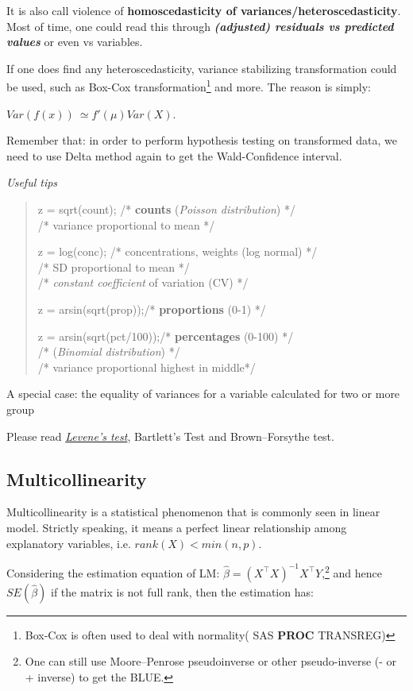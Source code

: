 It is also call violence of \textbf{homoscedasticity of variances/heteroscedasticity}. Most of time, one could read this through
\emph{\textbf{(adjusted) residuals vs predicted values}} or even vs
variables.

If one does find any heteroscedasticity, variance stabilizing
transformation could be used, such as Box-Cox transformation\footnote{Box-Cox
	is often used to deal with normality( SAS \textbf{PROC} TRANSREG)} and
more. The reason is simply:

\(Var(f(x))\  \simeq f'(\mu)Var(X)\).

Remember that: in order to perform hypothesis testing on transformed
data, we need to use Delta method again to get the Wald-Confidence
interval.

\emph{Useful tips}

\begin{quote}
	z = sqrt(count); /* \textbf{counts} (\emph{Poisson distribution}) */\\
	/* variance proportional to mean */
	
	z = log(conc); /* concentrations, weights (log normal) */\\
	/* SD proportional to mean */\\
	/* \emph{constant coefficient} of variation (CV) */
	
	z = arsin(sqrt(prop));/* \textbf{proportions} (0-1) */
	
	z = arsin(sqrt(pct/100));/* \textbf{percentages} (0-100) */\\
	/* (\emph{Binomial distribution}) */\\
	/* variance proportional highest in middle*/
\end{quote}

A special case: the equality of variances for a variable calculated for
two or more group

Please read
\href{https://en.wikipedia.org/wiki/Levene\%27s_test}{\emph{Levene's
		test}}, Bartlett's Test and Brown--Forsythe test.

\subsection{Multicollinearity}\label{multicollinearity}

Multicollinearity is a statistical phenomenon that is commonly seen in
linear model. Strictly speaking, it means a perfect linear relationship
among explanatory variables, i.e. \(rank(X) < min(n,p)\).

Considering the estimation equation of LM:
\(\hat{\beta} = (X^{\top}X)^{- 1}X^{\top}Y\),\footnote{One can still use
	Moore--Penrose pseudoinverse or other pseudo-inverse (- or + inverse)
	to get the BLUE.} and hence \(SE(\hat{\beta})\) if the matrix is not
full rank, then the estimation has:

